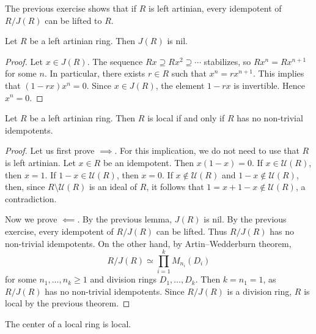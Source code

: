 The previous exercise shows that if $R$ is left artinian, 
every idempotent of $R/J(R)$ can be lifted to $R$. 

\begin{lemma}
\label{lem:J(R)_nil}
    Let $R$ be a left artinian ring. Then $J(R)$ is nil. 
\end{lemma}

\begin{proof}
    Let $x\in J(R)$. The sequence $Rx\supseteq Rx^2\supseteq\cdots$ stabilizes, so
    $Rx^n=Rx^{n+1}$ for some $n$. In particular, there exists $r\in R$ 
    such that $x^n=rx^{n+1}$. This implies that $(1-rx)x^n=0$. Since $x\in J(R)$, 
    the element $1-rx$ is invertible. Hence $x^n=0$.  
\end{proof}

\begin{theorem}
\label{thm:local_idempotent}
    Let $R$ be a left artinian ring. Then $R$ is local if and only if 
    $R$ has no non-trivial idempotents. 
\end{theorem}

\begin{proof}
    Let us first prove $\implies$. For this implication, we do not need to use that 
    $R$ is left artinian. Let $x\in R$ be an idempotent. Then $x(1-x)=0$. If $x\in\mathcal{U}(R)$, then 
    $x=1$. If $1-x\in\mathcal{U}(R)$, then $x=0$. If $x\not\in \mathcal{U}(R)$ and $1-x\not\in\mathcal{U}(R)$, 
    then, since $R\setminus\mathcal{U}(R)$ is an ideal of $R$, 
    it follows that 
    $1=x+1-x\not\in\mathcal{U}(R)$, a contradiction. 

    Now we prove $\impliedby$. By the previous lemma, $J(R)$ is nil. 
    By the previous exercise, every idempotent of $R/J(R)$ can be lifted. Thus $R/J(R)$ has 
    no non-trivial idempotents. On the other hand, by Artin--Wedderburn theorem, 
    \[
    R/J(R)\simeq\prod_{i=1}^kM_{n_i}(D_i)
    \]
    for some $n_1,\dots,n_k\geq1$ and division rings $D_1,\dots,D_k$. Then 
    $k=n_1=1$, as $R/J(R)$ has no non-trivial idempotents. Since $R/J(R)$ is a division ring, 
    $R$ is local by the previous theorem. 
\end{proof}

\begin{theorem}
    The center of a local ring is local. 
\end{theorem}

